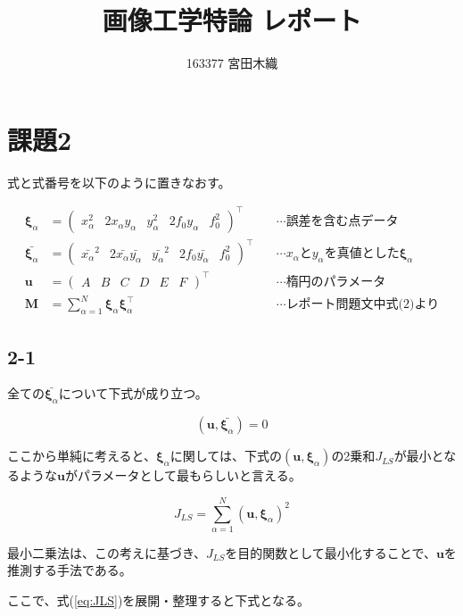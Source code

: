 \documentclass[12pt,a4j]{jsarticle}
\title{画像工学特論 レポート}
\author{163377 宮田木織}
\newcommand{\xa}{x_\alpha}
\newcommand{\ya}{y_\alpha}
\newcommand{\xia}{\bm{\xi}_\alpha}
\begin{document}
  \maketitle %

\section*{課題2}
  式と式番号を以下のように置きなおす。

  \begin{align}
    \xia &= \begin{pmatrix}\xa^2 & 2\xa\ya & \ya^2 & 2f_0\ya & f_0^2\end{pmatrix}^\top
     & \quad\cdots\text{誤差を含む点データ} \\
    \bar{\xia} &= \begin{pmatrix}\bar{\xa}^2 & 2\bar{\xa}\bar{\ya} & \bar{\ya}^2 & 2f_0\bar{\ya} & f_0^2\end{pmatrix}^\top
     & \quad\cdots\text{$\xa$と$\ya$を真値とした$\xia$} \\
    \bm{u} &= \begin{pmatrix}A & B & C & D & E & F\end{pmatrix}^\top
     & \quad\cdots\text{楕円のパラメータ} \\
    \bm{M} &= \sum_{\alpha = 1}^N \xia \xia^\top
     & \quad\cdots\text{レポート問題文中式(2)より} \label{eq:M}
  \end{align}

  \subsection*{2-1}

  全ての$\bar{\xia}$について下式が成り立つ。

  \begin{equation}
    (\bm{u}, \bar{\xia}) = 0
  \end{equation}

  ここから単純に考えると、$\xia$に関しては、下式の$(\bm{u}, \xia)$の2乗和$J_{LS}$が最小となるような$\bm{u}$がパラメータとして最もらしいと言える。

  \begin{equation}
    J_{LS} = \sum_{\alpha = 1}^N (\bm{u}, \xia)^2 \label{eq:JLS}
  \end{equation}

  最小二乗法は、この考えに基づき、$J_{LS}$を目的関数として最小化することで、$\bm{u}$を推測する手法である。\par
  ここで、式(\ref{eq:JLS})を展開・整理すると下式となる。
\end{document}
